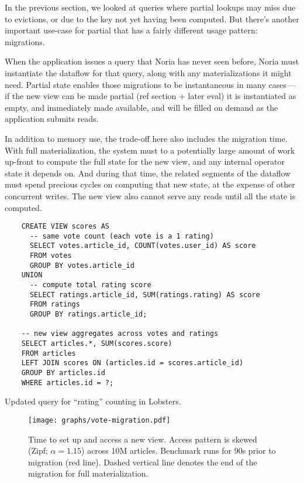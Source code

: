 In the previous section, we looked at queries where partial lookups may miss due
to evictions, or due to the key not yet having been computed. But there's
another important use-case for partial that has a fairly different usage
pattern: migrations.

When the application issues a query that Noria has never seen before, Noria must
instantiate the dataflow for that query, along with any materializations it
might need. Partial state enables those migrations to be instantaneous in many
cases\,---\,if the new view can be made partial (ref section + later eval) it is
instantiated as empty, and immediately made available, and will be filled on
demand as the application submits reads.

In addition to memory use, the trade-off here also includes the migration time.
With full materialization, the system must to a potentially large amount of work
up-front to compute the full state for the new view, and any internal operator
state it depends on. And during that time, the related segments of the dataflow
must spend precious cycles on computing that new state, at the expense of other
concurrent writes. The new view also cannot serve any reads until all the state
is computed.

\begin{listing}[h]
  \begin{verbatim}
    CREATE VIEW scores AS
      -- same vote count (each vote is a 1 rating)
      SELECT votes.article_id, COUNT(votes.user_id) AS score
      FROM votes
      GROUP BY votes.article_id
    UNION
      -- compute total rating score
      SELECT ratings.article_id, SUM(ratings.rating) AS score
      FROM ratings
      GROUP BY ratings.article_id;

    -- new view aggregates across votes and ratings
    SELECT articles.*, SUM(scores.score)
    FROM articles
    LEFT JOIN scores ON (articles.id = scores.article_id)
    GROUP BY articles.id
    WHERE articles.id = ?;
  \end{verbatim}
  \caption{Updated query for ``rating'' counting in Lobsters.}
  \label{l:ratings}
\end{listing}

\begin{figure}[h]
  \centering
  \texttt{[image: graphs/vote-migration.pdf]}
  \caption{Time to set up and access a new view. Access pattern is skewed (Zipf;
  $\alpha = 1.15$) across 10M articles. Benchmark runs for 90s prior to
  migration (red line). Dashed vertical line denotes the end of the migration
  for full materialization.}
  \label{f:vote-migration}
\end{figure}


